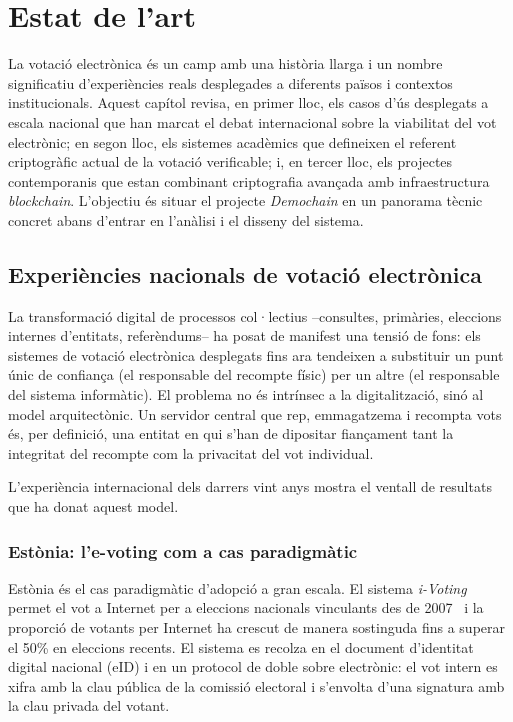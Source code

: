 

\chapter{Estat de l'art}
\label{ch:estat-art}

La votació electrònica és un camp amb una història llarga i un nombre significatiu d'experiències reals desplegades a
diferents països i contextos institucionals.
Aquest capítol revisa, en primer lloc, els casos d'ús desplegats a escala nacional que han marcat el debat internacional
sobre la viabilitat del vot electrònic; en segon lloc, els sistemes acadèmics que defineixen el referent criptogràfic
actual de la votació verificable; i, en tercer lloc, els projectes contemporanis que estan combinant criptografia
avançada amb infraestructura \emph{blockchain}.
L'objectiu és situar el projecte \emph{Demochain} en un panorama tècnic concret abans d'entrar en l'anàlisi i el disseny
del sistema.



\section{Experiències nacionals de votació electrònica}
\label{sec:experiencies-nacionals}

La transformació digital de processos col·lectius --consultes, primàries, eleccions internes d'entitats, referèndums--
ha posat de manifest una tensió de fons: els sistemes de votació electrònica desplegats fins ara tendeixen a substituir
un punt únic de confiança (el responsable del recompte físic) per un altre (el responsable del sistema informàtic).
El problema no és intrínsec a la digitalització, sinó al model arquitectònic.
Un servidor central que rep, emmagatzema i recompta vots és, per definició, una entitat en qui s'han de dipositar
fiançament tant la integritat del recompte com la privacitat del vot individual.

L'experiència internacional dels darrers vint anys mostra el ventall de resultats que ha donat aquest model.

\subsection{Estònia: l'e-voting com a cas paradigmàtic}
\label{subsec:estonia:-l'e-voting-com-a-cas-paradigmatic}

Estònia és el cas paradigmàtic d'adopció a gran escala.
El sistema \emph{i-Voting} permet el vot a Internet per a eleccions nacionals vinculants des de
2007~\cite{e-estonia2024voting} i la proporció de votants per Internet ha crescut de manera sostinguda fins a superar el
50\% en eleccions recents.
El sistema es recolza en el document d'identitat digital nacional (eID) i en un protocol de doble sobre electrònic: el
vot intern es xifra amb la clau pública de la comissió electoral i s'envolta d'una signatura amb la clau privada del
votant.

